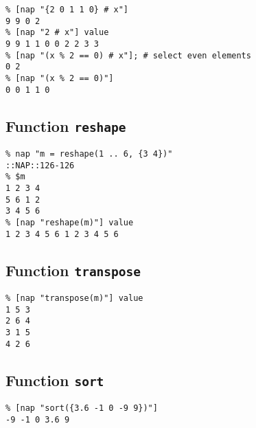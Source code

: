     \begin{verbatim}
% [nap "{2 0 1 1 0} # x"]
9 9 0 2
% [nap "2 # x"] value
9 9 1 1 0 0 2 2 3 3
% [nap "(x % 2 == 0) # x"]; # select even elements
0 2
% [nap "(x % 2 == 0)"]
0 0 1 1 0
\end{verbatim}

\subsection{Function \texttt{reshape}}

    \begin{verbatim}
% nap "m = reshape(1 .. 6, {3 4})"
::NAP::126-126
% $m
1 2 3 4
5 6 1 2
3 4 5 6
% [nap "reshape(m)"] value
1 2 3 4 5 6 1 2 3 4 5 6
\end{verbatim}

\subsection{Function \texttt{transpose}}

    \begin{verbatim}
% [nap "transpose(m)"] value
1 5 3
2 6 4
3 1 5
4 2 6
\end{verbatim}

\subsection{Function \texttt{sort}}

    \begin{verbatim}
% [nap "sort({3.6 -1 0 -9 9})"]
-9 -1 0 3.6 9
\end{verbatim}


